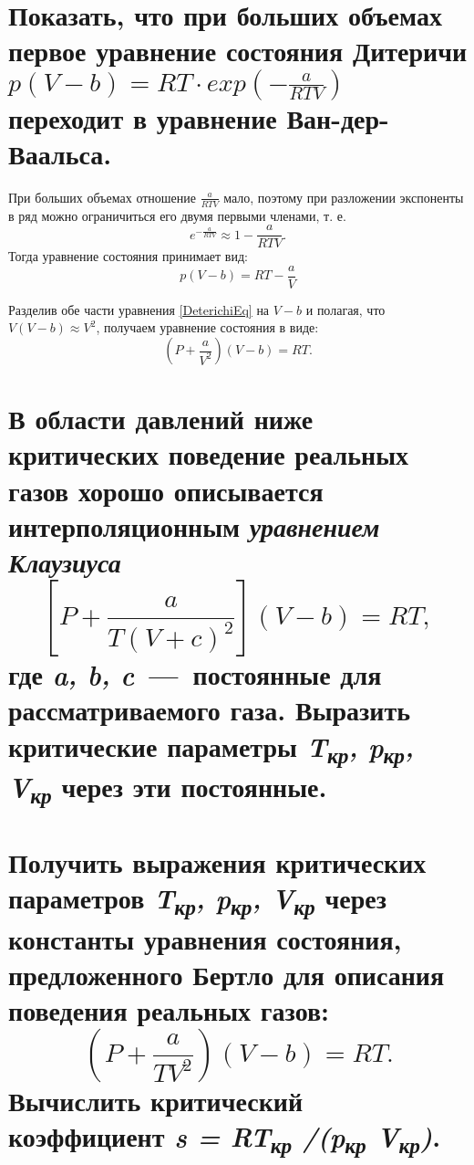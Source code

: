 \section{Показать, что при больших объемах первое уравнение
состояния Дитеричи $p(V - b) = RT\cdot exp(-\frac{a}{RTV})$ переходит в
уравнение Ван-дер-Ваальса.}

\solving{}

При больших объемах отношение $\frac{a}{RTV}$ мало, поэтому при
разложении экспоненты в ряд можно ограничиться его двумя первыми
членами, т. е.
\begin{equation}
  e^{-\frac{a}{RTV}} \approx 1 -\frac{a}{RTV}.
\end{equation}
Тогда уравнение состояния принимает вид:
\begin{equation} \label{DeterichiEq}
  p (V - b) = RT - \frac{a}{V}
\end{equation}

Разделив обе части уравнения \ref{DeterichiEq} на $V-b$ и полагая, что $V(V-b) \approx V^2$, получаем уравнение состояния в виде:
\begin{equation}
  \left (P + \frac{a}{V^2} \right )(V -b) = RT.
\end{equation}

\section{В области давлений ниже критических поведение реальных
газов хорошо описывается интерполяционным \emph{уравнением Клаузиуса}
\begin{equation}
  \left [P + \frac{a}{T(V+c)^2} \right ](V-b) = RT,
\end{equation}
где \emph{a, b, c}~---~постоянные для рассматриваемого газа.
Выразить критические параметры \emph{T\textsubscript{кр},
p\textsubscript{кр}, V\textsubscript{кр}} через эти постоянные.}

\section{Получить выражения критических параметров
\emph{T\textsubscript{кр}, p\textsubscript{кр}, V\textsubscript{кр}}
через константы уравнения состояния, предложенного Бертло для описания
поведения реальных газов:
\begin{equation}
  \left (P + \frac{a}{TV^2} \right )(V-b) = RT.
\end{equation}
Вычислить критический коэффициент \emph{s = RT\textsubscript{кр}
/(p\textsubscript{кр} V\textsubscript{кр})}.}

